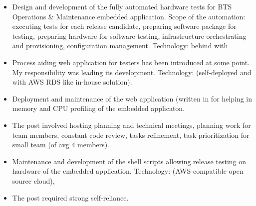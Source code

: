 \documentclass[10pt,a4paper,ragged2e,withhyper]{altacv}
\begin{document}
\begin{paracol}{2}

\begin{itemize}

\item Design and development of the fully automated hardware tests for
BTS Operations \& Maintenance embedded application. Scope of the automation:
executing tests for each release candidate, preparing software package for testing,
preparing hardware for software testing, infrastructure orchestrating and provisioning,
configuration management. Technology:   
 behind    
   with  
     

\item Process aiding web application for testers has been introduced at some
point. My responsibility was leading its development. Technology:
   (self-deployed and with AWS RDS like in-house solution).

\item Deployment and maintenance of the web application (written in 
for helping in memory and CPU profiling of the embedded applicaton.

\item The post involved hosting planning and technical meetings, planning work for
team members, constant code review, tasks refinement, task
prioritization for small team (of avg 4 members).

\end{itemize}

\medskip

\begin{itemize}
\item 
  Maintenance and development of the shell scripts allowing release testing
  on hardware of the embedded application. Technology:  
       
  (AWS-compatible open source cloud), 
\item
  The post required strong self-reliance.
\end{itemize}


\end{paracol}
\end{document}
